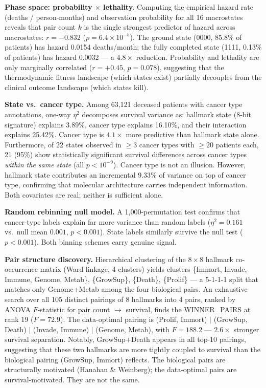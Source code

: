 \documentclass[
  11pt,
]{article}
\begin{document}
\textbf{Phase space: probability \(\times\) lethality.} Computing the
empirical hazard rate (deaths / person-months) and observation
probability for all 16 macrostates reveals that pair count \(k\) is the
single strongest predictor of hazard across macrostates: \(r = -0.832\)
(\(p = 6.4 \times 10^{-5}\)). The ground state (0000, 85.8\% of
patients) has hazard 0.0154 deaths/month; the fully completed state
(1111, 0.13\% of patients) has hazard 0.0032 --- a \(4.8\times\)
reduction. Probability and lethality are only marginally correlated
(\(r = +0.45\), \(p = 0.078\)), suggesting that the thermodynamic
fitness landscape (which states exist) partially decouples from the
clinical outcome landscape (which states kill).

\textbf{State vs.~cancer type.} Among 63,121 deceased patients with
cancer type annotations, one-way \(\eta^2\) decomposes survival variance
as: hallmark state (8-bit signature) explains 3.89\%, cancer type
explains 16.10\%, and their interaction explains 25.42\%. Cancer type is
\(4.1\times\) more predictive than hallmark state alone. Furthermore, of
22 states observed in \(\geq 3\) cancer types with \(\geq 20\) patients
each, 21 (95\%) show statistically significant survival differences
across cancer types \emph{within the same state} (all \(p < 10^{-9}\)).
Cancer type is not an illusion. However, hallmark state contributes an
incremental 9.33\% of variance on top of cancer type, confirming that
molecular architecture carries independent information. Both covariates
are real; neither is sufficient alone.

\textbf{Random rebinning null model.} A 1,000-permutation test confirms
that cancer-type labels explain far more variance than random labels
(\(\eta^2 = 0.161\) vs.~null mean \(0.001\), \(p < 0.001\)). State
labels similarly survive the null test (\(p < 0.001\)). Both binning
schemes carry genuine signal.

\textbf{Pair structure discovery.} Hierarchical clustering of the
\(8 \times 8\) hallmark co-occurrence matrix (Ward linkage, 4 clusters)
yields clusters \{Immort, Invade, Immune, Genome, Metab\}, \{GrowSup\},
\{Death\}, \{Prolif\} --- a 5-1-1-1 split that matches only Genome+Metab
among the four biological pairs. An exhaustive search over all 105
distinct pairings of 8 hallmarks into 4 pairs, ranked by ANOVA
\(F\)-statistic for pair count \(\rightarrow\) survival, finds the
WINNER\_PAIRS at rank 19 (\(F = 72.9\)). The data-optimal pairing is
(Prolif, Immort) \(|\) (GrowSup, Death) \(|\) (Invade, Immune) \(|\)
(Genome, Metab), with \(F = 188.2\) --- \(2.6\times\) stronger survival
separation. Notably, GrowSup+Death appears in all top-10 pairings,
suggesting that these two hallmarks are more tightly coupled to survival
than the biological pairing (GrowSup, Immort) reflects. The biological
pairs are structurally motivated (Hanahan \& Weinberg); the data-optimal
pairs are survival-motivated. They are not the same.
\end{document}
